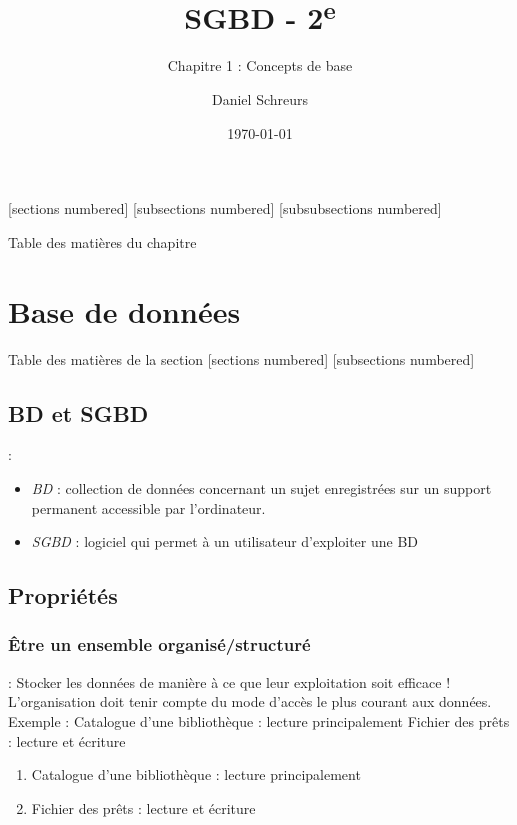 \documentclass[10pt]{beamer}
\title{SGBD - 2\textsuperscript{e}}
\subtitle{Chapitre 1 : Concepts de base}
\date{\today}
\author{Daniel Schreurs}
\institute{Haute École de Province de Liège}
\begin{document}
\maketitle

[sections numbered]
[subsections numbered]
[subsubsections numbered]
\begin{frame}[allowframebreaks]{Table des matières du chapitre}
    \tableofcontents[subsectionstyle=show/show/hide,subsubsectionstyle=show/show/hide,]
\end{frame}

\section{Base de données}
\begin{frame}{Table des matières de la section}
    [sections numbered]
    [subsections numbered]
    \tableofcontents[currentsection,currentsubsection,
        hideothersubsections,
        sectionstyle=show/shaded,
    ]
\end{frame}

\subsection{BD et SGBD}
\begin{frame}{\secname : \subsecname}
    \begin{itemize}
        \item \emph{BD} : collection de données concernant un sujet enregistrées sur un support permanent accessible par l’ordinateur.
        \item \emph{SGBD} : logiciel qui permet à un utilisateur d’exploiter une BD
    \end{itemize}
\end{frame}

\subsection{Propriétés}
\tocsss

\subsubsection{Être un ensemble organisé/structuré}
\begin{frame}{\subsecname : \subsubsecname}
    Stocker les données de manière à ce que leur exploitation soit efficace !
    L’organisation doit tenir compte du mode d’accès le plus courant aux données.
    Exemple :
    Catalogue d’une bibliothèque : lecture principalement
    Fichier des prêts : lecture et écriture
    \begin{enumerate}
        \item Catalogue d’une bibliothèque : lecture principalement
        \item Fichier des prêts : lecture et écriture
    \end{enumerate}
\end{frame}
\end{document}
